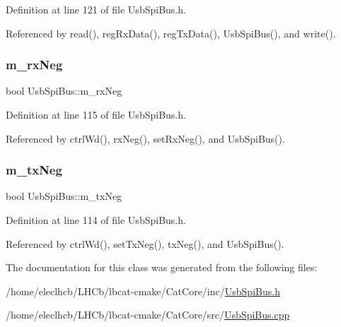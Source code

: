 Definition at line 121 of file Usb\+Spi\+Bus.\+h.



Referenced by read(), reg\+Rx\+Data(), reg\+Tx\+Data(), Usb\+Spi\+Bus(), and write().

\mbox{\label{classUsbSpiBus_abf36f2df24c3ec5363efe73c9771bbc8}} 
\subsubsection{\texorpdfstring{m\+\_\+rx\+Neg}{m\_rxNeg}}
{\footnotesize\ttfamily bool Usb\+Spi\+Bus\+::m\+\_\+rx\+Neg\hspace{0.3cm}{\ttfamily [private]}}



Definition at line 115 of file Usb\+Spi\+Bus.\+h.



Referenced by ctrl\+Wd(), rx\+Neg(), set\+Rx\+Neg(), and Usb\+Spi\+Bus().

\mbox{\label{classUsbSpiBus_a48528e7dcb036ecc1732581a89e16d10}} 
\subsubsection{\texorpdfstring{m\+\_\+tx\+Neg}{m\_txNeg}}
{\footnotesize\ttfamily bool Usb\+Spi\+Bus\+::m\+\_\+tx\+Neg\hspace{0.3cm}{\ttfamily [private]}}



Definition at line 114 of file Usb\+Spi\+Bus.\+h.



Referenced by ctrl\+Wd(), set\+Tx\+Neg(), tx\+Neg(), and Usb\+Spi\+Bus().



The documentation for this class was generated from the following files\+:\begin{DoxyCompactItemize}
\item 
/home/eleclhcb/\+L\+H\+Cb/lbcat-\/cmake/\+Cat\+Core/inc/\hyperlink{UsbSpiBus_8h}{Usb\+Spi\+Bus.\+h}\item 
/home/eleclhcb/\+L\+H\+Cb/lbcat-\/cmake/\+Cat\+Core/src/\hyperlink{UsbSpiBus_8cpp}{Usb\+Spi\+Bus.\+cpp}\end{DoxyCompactItemize}
